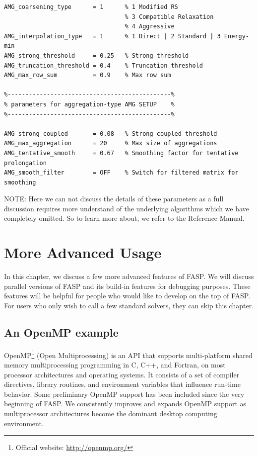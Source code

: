 \documentclass[11pt]{memoir}
\begin{document}
\begin{lstlisting}
AMG_coarsening_type      = 1      % 1 Modified RS
                                  % 3 Compatible Relaxation
                                  % 4 Aggressive
AMG_interpolation_type   = 1      % 1 Direct | 2 Standard | 3 Energy-min
AMG_strong_threshold     = 0.25   % Strong threshold
AMG_truncation_threshold = 0.4    % Truncation threshold
AMG_max_row_sum          = 0.9    % Max row sum

%----------------------------------------------%
% parameters for aggregation-type AMG SETUP    %
%----------------------------------------------%

AMG_strong_coupled       = 0.08   % Strong coupled threshold
AMG_max_aggregation      = 20     % Max size of aggregations
AMG_tentative_smooth     = 0.67   % Smoothing factor for tentative prolongation
AMG_smooth_filter        = OFF    % Switch for filtered matrix for smoothing
\end{lstlisting}

\begin{snugshade}\noindent
NOTE: Here we can not discuss the details of these parameters as a full discussion requires more understand of the underlying algorithms which we have completely omitted. So to learn more about, we refer to the Reference Manual.
\end{snugshade}

\chapter{More Advanced Usage}\label{ch:advanced}

In this chapter, we discuss a few more advanced features of FASP. We will discuss parallel versions of FASP and its build-in features for debugging purposes. These features will be helpful for people who would like to develop on the top of FASP. For users who only wish to call a few standard solvers, they can skip this chapter.

\section{An OpenMP example}\label{sec:mop}

OpenMP\footnote{Official website: \url{http://openmp.org/}} (Open Multiprocessing) is an API that supports multi-platform shared memory multiprocessing programming in C, C++, and Fortran, on most processor architectures and operating systems. It consists of a set of compiler directives, library routines, and environment variables that influence run-time behavior. Some preliminary OpenMP support has been included since the very beginning of FASP. We consistently improves and expands OpenMP support as multiprocessor architectures become the dominant desktop computing environment.
\end{document}

